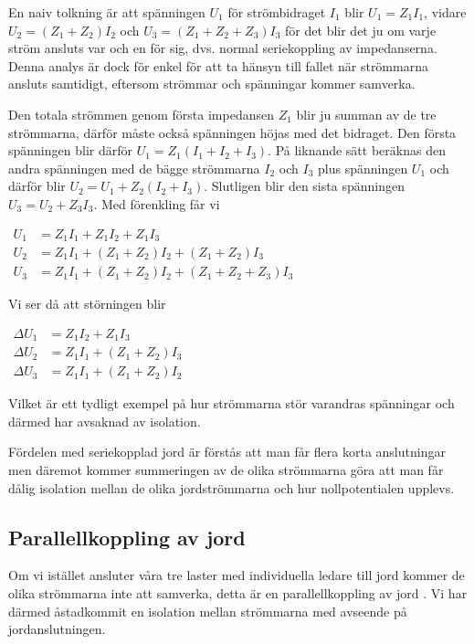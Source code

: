 En naiv tolkning är att spänningen \(U_1\) för strömbidraget \(I_1\) blir
\(U_1 = Z_1 I_1\), vidare \(U_2 = (Z_1 + Z_2) I_2\) och
\(U_3 = (Z_1 + Z_2 + Z_3) I_3\) för det blir det ju om varje ström ansluts var
och en för sig, dvs. normal seriekoppling av impedanserna. Denna analys är
dock för enkel för att ta hänsyn till fallet när strömmarna ansluts samtidigt,
eftersom strömmar och spänningar kommer samverka.

Den totala strömmen genom första impedansen \(Z_1\) blir ju summan av de tre
strömmarna, därför måste också spänningen höjas med det bidraget. Den första
spänningen blir därför \(U_1=Z_1 (I_1 + I_2 + I_3)\). På liknande sätt beräknas
den andra spänningen med de bägge strömmarna \(I_2\) och \(I_3\) plus
spänningen \(U_1\) och därför blir \(U_2 = U_1 + Z_2 (I_2 + I_3)\).
Slutligen blir den sista spänningen \(U_3 = U_2 + Z_3 I_3\). Med förenkling
får vi

\(
\begin{array}{ll}
U_1 & = Z_1 I_1 + Z_1 I_2 + Z_1 I_3 \\
U_2 & = Z_1 I_1 + (Z_1 + Z_2) I_2 + (Z_1 + Z_2) I_3 \\
U_3 & = Z_1 I_1 + (Z_1 + Z_2) I_2 + (Z_1 + Z_2 + Z_3) I_3
\end{array}
\)

Vi ser då att störningen blir

\(
\begin{array}{ll}
\Delta U_1 & =  Z_1 I_2 + Z_1 I_3 \\
\Delta U_2 & = Z_1 I_1 + (Z_1 + Z_2) I_3 \\
\Delta U_3 & = Z_1 I_1 + (Z_1 + Z_2) I_2
\end{array}
\)

Vilket är ett tydligt exempel på hur strömmarna stör varandras spänningar och
därmed har avsaknad av isolation.

Fördelen med seriekopplad jord är förstås att man får flera korta anslutningar
men däremot kommer summeringen av de olika strömmarna göra att man får dålig
isolation mellan de olika jordströmmarna och hur nollpotentialen upplevs.

\subsection{Parallellkoppling av jord}

Om vi istället ansluter våra tre laster med individuella ledare till jord
kommer de olika strömmarna inte att samverka, detta är en parallellkoppling
av jord \cite[3]{ott1988}. Vi har därmed åstadkommit en isolation mellan
strömmarna med avseende på jordanslutningen.

